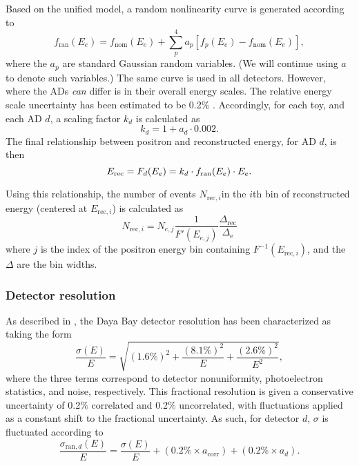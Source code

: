 \documentclass[../thesis.tex]{subfiles}
\begin{document}
Based on the unified model, a random nonlinearity curve is generated according to
\begin{equation}
  \label{eq:fitRandomNL}
  f_{\mathrm{ran}}(E_e) = f_{\mathrm{nom}}(E_e) + \sum_p^4 a_p [ f_p(E_e) - f_{\mathrm{nom}}(E_e)],
\end{equation}
where the $a_p$ are standard Gaussian random variables. (We will continue using $a$ to denote such variables.) The same curve is used in all detectors. However, where the ADs \textit{can} differ is in their overall energy scales. The relative energy scale uncertainty has been estimated to be 0.2\% \cite{berkeley_shapefit_P14A}. Accordingly, for each toy, and each AD $d$, a scaling factor $k_d$ is calculated as
\begin{equation}
  k_d = 1 + a_d \cdot 0.002.
\end{equation}
The final relationship between positron and reconstructed energy, for AD $d$, is then
\begin{equation}
  E_\mathrm{rec} = F_d(E_e) = k_d \cdot f_{\mathrm{ran}}(E_e) \cdot E_e.
\end{equation}

Using this relationship, the number of events $N_{\mathrm{rec},i}$in the $i$th bin of reconstructed energy (centered at $E_{\mathrm{rec},i}$) is calculated as
\begin{equation}
  \label{eq:fitNrec}
  N_{\mathrm{rec},i} = N_{e,j} \frac{1}{F'(E_{e,j})} \frac{\Delta_{\mathrm{rec}}}{\Delta_{\mathrm{e}}}
\end{equation}
where $j$ is the index of the positron energy bin containing $F^{-1}(E_{\mathrm{rec},i})$, and the $\Delta$ are the bin widths.

\subsubsection{Detector resolution}

As described in \cite{An_2017}, the Daya Bay detector resolution has been characterized as taking the form
\begin{equation}
  \frac{\sigma(E)}{E} = \sqrt{(1.6\%)^2 + \frac{(8.1\%)^2}{E}
    + \frac{(2.6\%)^2}{E^2}},
\end{equation}
where the three terms correspond to detector nonuniformity, photoelectron statistics, and noise, respectively. This fractional resolution is given a conservative uncertainty of 0.2\% correlated and 0.2\% uncorrelated, with fluctuations applied as a constant shift to the fractional uncertainty. As such, for detector $d$, $\sigma$ is fluctuated according to
\begin{equation}
  \frac{\sigma_{\mathrm{ran},d}(E)}{E} = \frac{\sigma(E)}{E} + (0.2\% \times a_{\mathrm{corr}})  + (0.2\% \times a_d).
\end{equation}
\end{document}
